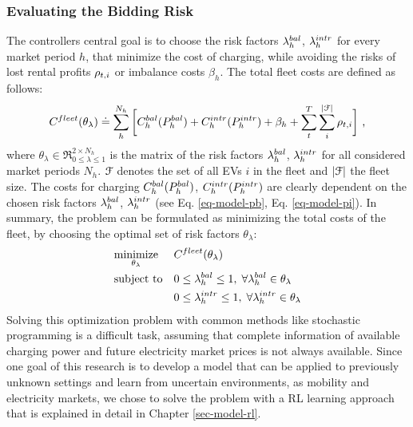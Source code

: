 \documentclass[a4paper, 12pt]{article}
\begin{document}
\subsubsection{Evaluating the Bidding Risk}
\label{sec:org84ea1c7}
The controllers central goal is to choose the risk factors \(\lambda^{bal}_{h}\), \(\lambda^{intr}_{h}\)
for every market period \(h\), that minimize the cost of charging, while avoiding
the risks of lost rental profits \(\rho_{t,i}\) or imbalance costs \(\beta_h\). The total
fleet costs are defined as follows:
\begin{equation} \label{eq-model-fleetcosts}
    C^{fleet}_{}(\theta_{\lambda}) \doteq \sum^{N_h}_h
    \bigg[ C^{bal}_{h}(P^{bal}_{h}) + C^{intr}_{h}(P^{intr}_{h}) + \beta_{h}
    + \sum_t^{T} \sum_i^{|{\cal{F}}|} \rho_{t,i} \bigg] \text{ ,}
\end{equation}
where \(\theta_{\lambda}\!\in\!\Re_{0 \leq \lambda \leq 1}^{2 \times N_h}\) is the
matrix of the risk factors \(\lambda^{bal}_{h}\), \(\lambda^{intr}_{h}\) for all considered market periods
\(N_h\). \({\cal{F}}\) denotes the set of all EVs \(i\) in the fleet and \(|{\cal{F}}|\) the fleet
size. The costs for charging \(C^{bal}_{h}(P^{bal}_{h})\), \(C^{intr}_{h}(P^{intr}_{h})\) are clearly
dependent on the chosen risk factors \(\lambda^{bal}_{h}\), \(\lambda^{intr}_{h}\) (see Eq.
\ref{eq-model-pb}, Eq. \ref{eq-model-pi}). In summary, the problem can be formulated
as minimizing the total costs of the fleet, by choosing the optimal set of risk
factors \(\theta_{\lambda}\):
\begin{equation}
\begin{aligned}
    & \underset{\theta_{\lambda}}{\text{minimize}}
    && C^{fleet}_{}(\theta_{\lambda}) \\
    & \text{subject to}
    && 0 \leq \lambda^{bal}_{h} \leq 1, \; \forall \lambda^{bal}_{h} \in \theta_{\lambda}\\
    &&& 0 \leq \lambda^{intr}_{h} \leq 1, \; \forall \lambda^{intr}_{h} \in \theta_{\lambda}\\
\end{aligned}
\end{equation}
Solving this optimization problem with common methods like stochastic
programming is a difficult task, assuming that complete information of available
charging power and future electricity market prices is not always available.
Since one goal of this research is to develop a model that can be applied to
previously unknown settings and learn from uncertain environments, as mobility
and electricity markets, we chose to solve the problem with a RL learning
approach that is explained in detail in Chapter \ref{sec-model-rl}.
\end{document}
